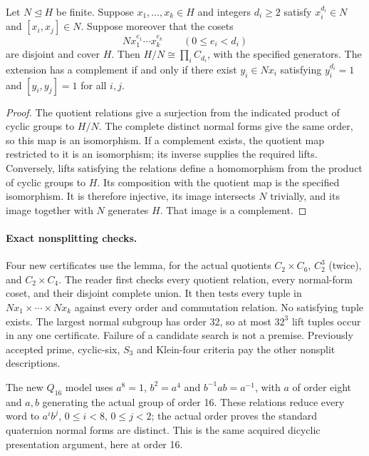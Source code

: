 \documentclass[11pt]{article}
\begin{document}
\newpage
\begin{lemma}
Let $N\mathrel{\trianglelefteq}H$ be finite. Suppose $x_1,\ldots,x_k\in H$
and integers $d_i\geq2$ satisfy $x_i^{d_i}\in N$ and
$[x_i,x_j]\in N$. Suppose moreover that the cosets
\[
 N x_1^{e_1}\cdots x_k^{e_k}\qquad(0\leq e_i<d_i)
\]
are disjoint and cover $H$. Then $H/N\cong\prod_i C_{d_i}$, with the
specified generators. The extension has a complement if and only if there
exist $y_i\in Nx_i$ satisfying $y_i^{d_i}=1$ and $[y_i,y_j]=1$ for all
$i,j$.
\end{lemma}
\begin{proof}
The quotient relations give a surjection from the indicated product of
cyclic groups to $H/N$. The complete distinct normal forms give the same
order, so this map is an isomorphism. If a complement exists, the quotient
map restricted to it is an isomorphism; its inverse supplies the required
lifts. Conversely, lifts satisfying the relations define a homomorphism
from the product of cyclic groups to $H$. Its composition with the quotient
map is the specified isomorphism. It is therefore injective, its image
intersects $N$ trivially, and its image together with $N$ generates $H$.
That image is a complement.
\end{proof}

\paragraph{Exact nonsplitting checks.}
Four new certificates use the lemma, for the actual quotients
$C_2\times C_6$, $C_2^3$ (twice), and $C_2\times C_4$.
The reader first checks every quotient relation, every normal-form coset,
and their disjoint complete union. It then tests every tuple in
$Nx_1\times\cdots\times Nx_k$ against every order and commutation relation.
No satisfying tuple exists. The largest normal subgroup has order 32,
so at most $32^3$ lift tuples occur in any one certificate. Failure of a
candidate search is not a premise. Previously accepted prime, cyclic-six,
$S_3$ and Klein-four criteria pay the other nonsplit descriptions.

The new $Q_{16}$ model uses
$a^8=1$, $b^2=a^4$ and $b^{-1}ab=a^{-1}$, with $a$ of order eight and
$a,b$ generating the actual group of order 16. These relations reduce every
word to $a^i b^j$, $0\leq i<8$, $0\leq j<2$; the actual order proves the
standard quaternion normal forms are distinct. This is the same acquired
dicyclic presentation argument, here at order 16.
\end{document}

